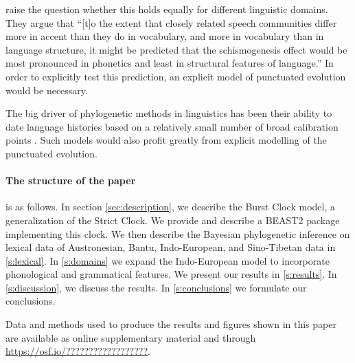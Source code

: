\documentclass[a4paper,12pt]{scrartcl}
\begin{document}


\Textcite{gray2013three} raise the question whether this holds equally for
different linguistic domains. They argue that “[t]o the extent that closely
related speech communities differ more in accent than they do in vocabulary, and
more in vocabulary than in language structure, it might be predicted that the
schismogenesis effect would be most pronounced in phonetics and least in
structural features of language.” In order to explicitly test this prediction,
an explicit model of punctuated evolution would be necessary.

The big driver of phylogenetic methods in linguistics has been their ability to
date language histories based on a relatively small number of broad calibration
points \parencite{}. Such models would also profit greatly from explicit
modelling of the punctuated evolution.

\paragraph{The structure of the paper} is as follows. In section
\cref{sec:description}, we describe the Burst Clock model, a generalization of
the Strict Clock. We provide and describe a BEAST2 \parencite{beast2} package
implementing this clock. We then describe the Bayesian phylogenetic inference on
lexical data of Austronesian, Bantu, Indo-European, and Sino-Tibetan data in
\cref{s:lexical}. In \cref{s:domains} we expand the Indo-European model to
incorporate phonological and grammatical features. We present our results in
\cref{s:results}. In \cref{s:discussion}, we discuss the results. In
\cref{s:conclusions} we formulate our conclusions.

Data and methods used to produce the results and figures shown in this paper are
available as online supplementary material and through
\url{https://osf.io/??????????????????}.
\end{document}
